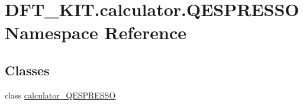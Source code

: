 \hypertarget{namespace_d_f_t___k_i_t_1_1calculator_1_1_q_e_s_p_r_e_s_s_o}{\section{D\+F\+T\+\_\+\+K\+I\+T.\+calculator.\+Q\+E\+S\+P\+R\+E\+S\+S\+O Namespace Reference}
\label{namespace_d_f_t___k_i_t_1_1calculator_1_1_q_e_s_p_r_e_s_s_o}
}
\subsection*{Classes}
\begin{DoxyCompactItemize}
\item 
class \hyperlink{class_d_f_t___k_i_t_1_1calculator_1_1_q_e_s_p_r_e_s_s_o_1_1calculator___q_e_s_p_r_e_s_s_o}{calculator\+\_\+\+Q\+E\+S\+P\+R\+E\+S\+S\+O}
\end{DoxyCompactItemize}
